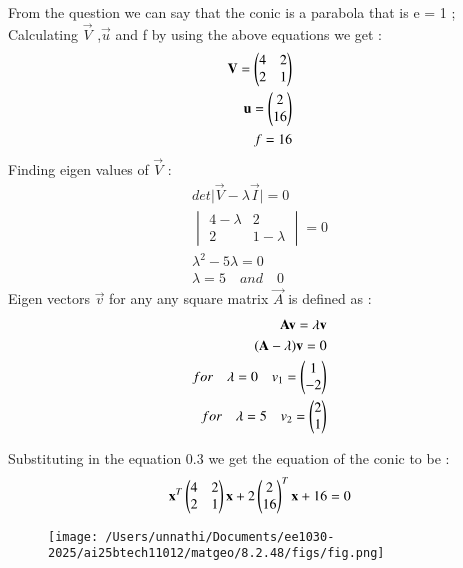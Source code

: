 \documentclass[journal]{IEEEtran}
\begin{document}
From the question we can say that the conic is a parabola that is e = 1 ;\\
Calculating $\vec{V}$ ,$\vec{u}$ and f by using the above equations we get :
\begin{align}
   \mathbf{V} = \begin{pmatrix}4 & 2\\2 & 1\end{pmatrix}\\
   \mathbf{u} = \begin{pmatrix}2\\16\end{pmatrix}\\
   f = 16
\end{align}
Finding eigen values of $\vec{V}$ :
\begin{align}
    det\lvert \vec{V} - \lambda\vec{I} \rvert = 0\\
    \begin{vmatrix} 4 - \lambda & 2 \\ 2 & 1 - \lambda \end{vmatrix} = 0\\
    \lambda^2 - 5\lambda = 0\\
    \lambda = 5 \quad and \quad 0 
\end{align}
Eigen vectors $\vec{v}$ for any any square matrix $\vec{A}$ is defined as :
\begin{align}
    \mathbf{A}\mathbf{v} = \lambda\mathbf{v}\\
    (\mathbf{A} - \lambda)\mathbf{v} = 0 \\
    for \quad \lambda = 0 \quad v_1 = \begin{pmatrix}1\\-2\end{pmatrix}\\
        for \quad \lambda = 5 \quad v_2 = \begin{pmatrix}2\\1\end{pmatrix}
\end{align}

Substituting in the equation 0.3 we get the equation of the conic to be :
\begin{align}
  \mathbf{x}^{T}\begin{pmatrix}4 & 2\\2 & 1\end{pmatrix}\mathbf{x} + 2\begin{pmatrix}2 \\ 16\end{pmatrix}^{T}\mathbf{x} +16 =0
\end{align}





\begin{figure}[h!]
   \centering
   \texttt{[image: /Users/unnathi/Documents/ee1030-2025/ai25btech11012/matgeo/8.2.48/figs/fig.png]}
   \caption{}
   \label{stemplot}
\end{figure}
\end{document}
